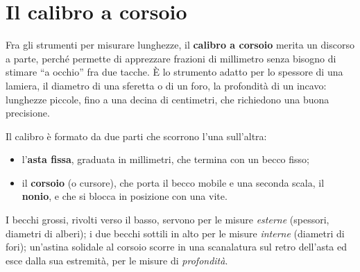 





















\section{Il calibro a corsoio}
Fra gli strumenti per misurare lunghezze, il \textbf{calibro a corsoio} merita un discorso a parte, perché permette di apprezzare frazioni di millimetro senza bisogno di stimare ``a occhio'' fra due tacche. È lo strumento adatto per lo spessore di una lamiera, il diametro di una sferetta o di un foro, la profondità di un incavo: lunghezze piccole, fino a una decina di centimetri, che richiedono una buona precisione.

Il calibro è formato da due parti che scorrono l'una sull'altra:
\begin{itemize}
    \item l'\textbf{asta fissa}, graduata in millimetri, che termina con un becco fisso;
    \item il \textbf{corsoio} (o cursore), che porta il becco mobile e una seconda scala, il \textbf{nonio}, e che si blocca in posizione con una vite.
\end{itemize}
I becchi grossi, rivolti verso il basso, servono per le misure \emph{esterne} (spessori, diametri di alberi); i due becchi sottili in alto per le misure \emph{interne} (diametri di fori); un'astina solidale al corsoio scorre in una scanalatura sul retro dell'asta ed esce dalla sua estremità, per le misure di \emph{profondità}.

